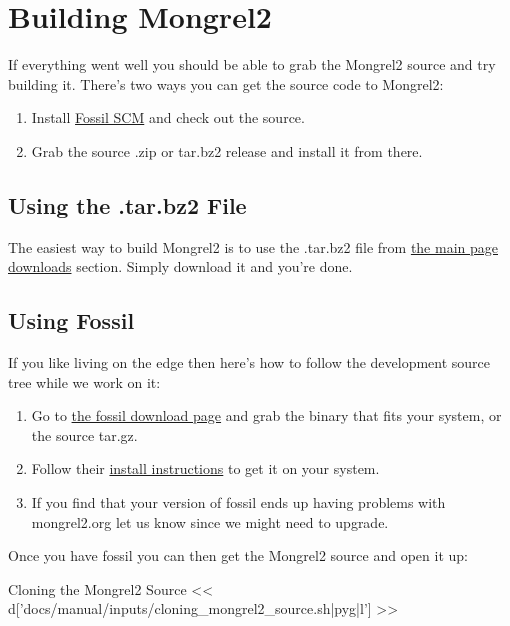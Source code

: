 \section{Building Mongrel2}

If everything went well you should be able to grab the Mongrel2 source
and try building it.  There's two ways you can get the source code to
Mongrel2:

\begin{enumerate}
\item Install \href{http://fossil-scm.org}{Fossil SCM} and check out the source.
\item Grab the source .zip or tar.bz2 release and install it from there.
\end{enumerate}

\subsection{Using the .tar.bz2 File}

The easiest way to build Mongrel2 is to use the .tar.bz2 file from 
\href{http://mongrel2.org/home#download}{the main page downloads} section.
Simply download it and you're done.


\subsection{Using Fossil}

If you like living on the edge then here's how to follow the development source
tree while we work on it:

\begin{enumerate}
\item Go to \href{http://www.fossil-scm.org/download.html}{the fossil download page} and
    grab the binary that fits your system, or the source tar.gz.
\item Follow their \href{http://fossil-scm.org/index.html/doc/tip/www/build.wiki}{install instructions}
    to get it on your system.
\item If you find that your version of fossil ends up having problems with mongrel2.org let us know since
    we might need to upgrade.
\end{enumerate}

Once you have fossil you can then get the Mongrel2 source and open it up:

\begin{code}{Cloning the Mongrel2 Source}
<< d['docs/manual/inputs/cloning_mongrel2_source.sh|pyg|l'] >>
\end{code}

